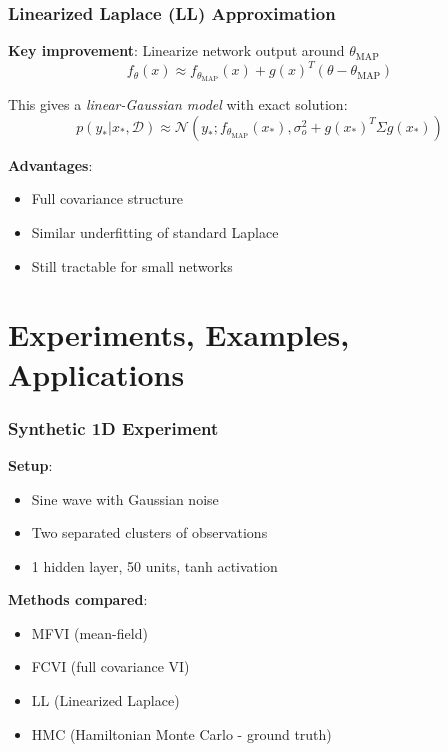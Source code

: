 \documentclass[aspectratio=169, 12pt]{beamer}
\begin{document}
\begin{frame}
\frametitle{Linearized Laplace (LL) Approximation}
\textbf{Key improvement}: Linearize network output around $\theta_{\text{MAP}}$
$$f_{\theta}(x) \approx f_{\theta_{\text{MAP}}}(x) + g(x)^T(\theta - \theta_{\text{MAP}})$$

\vspace{0.3cm}
This gives a \textit{linear-Gaussian model} with exact solution:
$$p(y_*|x_*, \mathcal{D}) \approx \mathcal{N}(y_*; f_{\theta_{\text{MAP}}}(x_*), \sigma_o^2 + g(x_*)^T\Sigma g(x_*))$$

\vspace{0.5cm}
\textbf{Advantages}:
\begin{itemize}
\item Full covariance structure
\item Similar underfitting of standard Laplace
\item Still tractable for small networks
\end{itemize}
\end{frame}

\section{Experiments, Examples, Applications}
\begin{frame}
\frametitle{Synthetic 1D Experiment}
\textbf{Setup}:
\begin{itemize}
\item Sine wave with Gaussian noise
\item Two separated clusters of observations
\item 1 hidden layer, 50 units, tanh activation
\end{itemize}

\vspace{0.3cm}
\textbf{Methods compared}:
\begin{itemize}
\item MFVI (mean-field)
\item FCVI (full covariance VI)
\item LL (Linearized Laplace)
\item HMC (Hamiltonian Monte Carlo - ground truth)
\end{itemize}
\end{frame}
\end{document}
